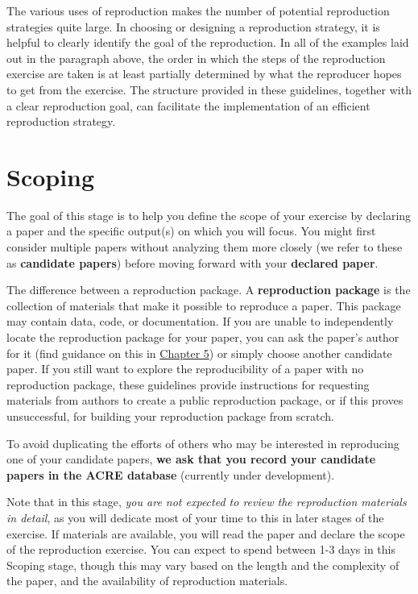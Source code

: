 \documentclass[]{book}
\begin{document}
The various uses of reproduction makes the number of potential reproduction strategies quite large. In choosing or designing a reproduction strategy, it is helpful to clearly identify the goal of the reproduction. In all of the examples laid out in the paragraph above, the order in which the steps of the reproduction exercise are taken is at least partially determined by what the reproducer hopes to get from the exercise. The structure provided in these guidelines, together with a clear reproduction goal, can facilitate the implementation of an efficient reproduction strategy.

\hypertarget{scoping}{%
\chapter{Scoping}\label{scoping}}

The goal of this stage is to help you define the scope of your exercise by declaring a paper and the specific output(s) on which you will focus. You might first consider multiple papers without analyzing them more closely (we refer to these as \textbf{candidate papers}) before moving forward with your \textbf{declared paper}.

The difference between a reproduction package. A \textbf{reproduction package} is the collection of materials that make it possible to reproduce a paper. This package may contain data, code, or documentation. If you are unable to independently locate the reproduction package for your paper, you can ask the paper's author for it (find guidance on this in \href{https://bitss.github.io/ACRE/guidance-for-a-constructive-exchange-between-reproducers-and-original-authors.html}{Chapter 5}) or simply choose another candidate paper. If you still want to explore the reproducibility of a paper with no reproduction package, these guidelines provide instructions for requesting materials from authors to create a public reproduction package, or if this proves unsuccessful, for building your reproduction package from scratch.

To avoid duplicating the efforts of others who may be interested in reproducing one of your candidate papers, \textbf{we ask that you record your candidate papers in the ACRE database} (currently under development).

Note that in this stage, \emph{you are not expected to review the reproduction materials in detail}, as you will dedicate most of your time to this in later stages of the exercise. If materials are available, you will read the paper and declare the scope of the reproduction exercise. You can expect to spend between 1-3 days in this Scoping stage, though this may vary based on the length and the complexity of the paper, and the availability of reproduction materials.
\end{document}
